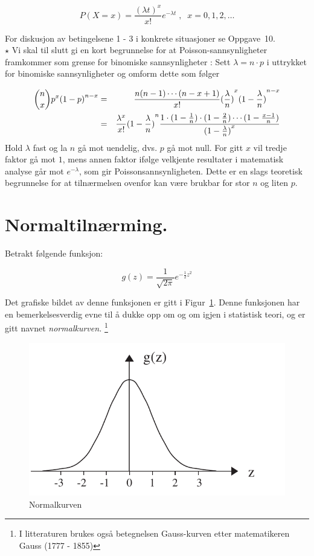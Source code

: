 \[ P(X=x)=\frac{{(\lambda t)}^x}{x!}e^{-\lambda t} \; , \;\;
                                           x=0,1,2, \ldots \] 

\noindent For diskusjon av betingelsene 1 - 3 i konkrete situasjoner se
Oppgave~10. \\

\small
\noindent $\star$ Vi skal til slutt gi en kort begrunnelse for at
 Poisson-sannsynligheter
 framkommer som grense for binomiske
sannsynligheter : Sett $\lambda =n\cdot p$ i uttrykket for
binomiske sannsynligheter og omform dette som følger

\begin{eqnarray*}
 {{n}\choose{x}}p^x{(1-p)}^{n-x}&=&\frac{n(n-1)\cdots (n-x+1)}{x!}
                  {(\frac{\lambda}{n})}^x{(1-\frac{\lambda}{n})}^{n-x} \\
       &=&\frac{{\lambda}^x}{x!}{(1-\frac{\lambda}{n})}^n
 \frac{1 \cdot (1-\frac{1}{n}) \cdot (1-\frac{2}{n}) \cdots (1-\frac{x-1}{n})}
             {{(1-\frac{\lambda}{n})}^x}              
\end{eqnarray*}
\noindent Hold $\lambda$ fast og la $n$ gå mot uendelig, dvs. $p$ gå
 mot null. For gitt $x$ vil tredje faktor gå mot $1$, mens annen
faktor ifølge velkjente resultater i matematisk analyse går mot
$e^{-\lambda}$, som gir Poissonsannsynligheten. Dette er en slags
teoretisk begrunnelse for at tilnærmelsen ovenfor kan være
brukbar for stor $n$ og liten $p$.
                                                        
\normalsize

\section{Normaltilnærming.}

Betrakt følgende funksjon:

\[  g(z)= \frac{1}{\sqrt{2 \pi}}e^{-\frac{1}{2}z^2} \]

\noindent Det grafiske bildet av denne funksjonen er gitt i Figur~\ref{fig:Normalkurven}. Denne
funksjonen har en bemerkelsesverdig evne til å dukke opp om og om
igjen i statistisk teori, og er gitt navnet {\em normalkurven.}
\footnote{I litteraturen brukes
også betegnelsen Gauss-kurven etter matematikeren Gauss (1777 - 1855)}

\begin{figure}[ht]
\centering
	\includegraphics[scale=1.0]{figurer/fig6_1.pdf} 
\caption{Normalkurven}
	\label{fig:Normalkurven}
\end{figure}

